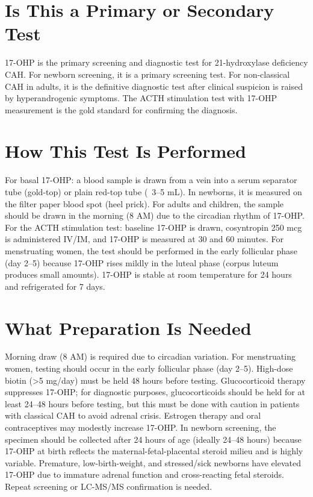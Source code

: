\section*{Is This a Primary or Secondary Test}
17-OHP is the primary screening and diagnostic test for 21-hydroxylase deficiency CAH. For newborn screening, it is a primary screening test. For non-classical CAH in adults, it is the definitive diagnostic test after clinical suspicion is raised by hyperandrogenic symptoms. The ACTH stimulation test with 17-OHP measurement is the gold standard for confirming the diagnosis.

\section*{How This Test Is Performed}
For basal 17-OHP: a blood sample is drawn from a vein into a serum separator tube (gold-top) or plain red-top tube (~3--5 mL). In newborns, it is measured on the filter paper blood spot (heel prick). For adults and children, the sample should be drawn in the morning (8 AM) due to the circadian rhythm of 17-OHP. For the ACTH stimulation test: baseline 17-OHP is drawn, cosyntropin 250 mcg is administered IV/IM, and 17-OHP is measured at 30 and 60 minutes. For menstruating women, the test should be performed in the early follicular phase (day 2--5) because 17-OHP rises mildly in the luteal phase (corpus luteum produces small amounts). 17-OHP is stable at room temperature for 24 hours and refrigerated for 7 days.

\section*{What Preparation Is Needed}
Morning draw (8 AM) is required due to circadian variation. For menstruating women, testing should occur in the early follicular phase (day 2--5). High-dose biotin (>5 mg/day) must be held 48 hours before testing. Glucocorticoid therapy suppresses 17-OHP; for diagnostic purposes, glucocorticoids should be held for at least 24--48 hours before testing, but this must be done with caution in patients with classical CAH to avoid adrenal crisis. Estrogen therapy and oral contraceptives may modestly increase 17-OHP. In newborn screening, the specimen should be collected after 24 hours of age (ideally 24--48 hours) because 17-OHP at birth reflects the maternal-fetal-placental steroid milieu and is highly variable. Premature, low-birth-weight, and stressed/sick newborns have elevated 17-OHP due to immature adrenal function and cross-reacting fetal steroids. Repeat screening or LC-MS/MS confirmation is needed.


